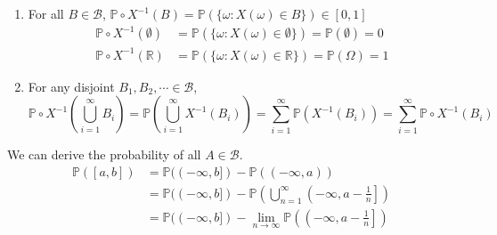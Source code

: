 \documentclass{huhtakm-template-book}
\newcommand{\prob}{\mathbb{P}}
\begin{document}
    \begin{proofing}
        \begin{enumerate}
            \item For all $B\in\mathcal{B}$, $\prob\circ X^{-1}(B)=\prob(\{\omega:X(\omega)\in B\})\in [0,1]$
            \begin{align*}
                \prob\circ X^{-1}(\emptyset)&=\prob(\{\omega:X(\omega)\in\emptyset\})=\prob(\emptyset)=0\\
                \prob\circ X^{-1}(\mathbb{R})&=\prob(\{\omega:X(\omega)\in\mathbb{R}\})=\prob(\Omega)=1
            \end{align*}
            \item For any disjoint $B_{1},B_{2},\cdots\in\mathcal{B}$,
            \begin{equation*}
                \prob\circ X^{-1}\left(\bigcup_{i=1}^{\infty}B_{i}\right)=\prob\left(\bigcup_{i=1}^{\infty}X^{-1}(B_{i})\right)=\sum_{i=1}^{\infty}\prob(X^{-1}(B_{i}))=\sum_{i=1}^{\infty}\prob\circ X^{-1}(B_{i})
            \end{equation*}
        \end{enumerate}
    \end{proofing}
    \begin{rem}
        We can derive the probability of all $A\in\mathcal{B}$.
        \begin{align*}
            \prob([a,b])&=\prob((-\infty,b])-\prob((-\infty,a))\\
            &=\prob((-\infty,b])-\prob\left(\bigcup_{n=1}^{\infty}\left(-\infty,a-\frac{1}{n}\right]\right)\\
            &=\prob((-\infty,b])-\lim_{n\to\infty}\prob\left(\left(-\infty,a-\frac{1}{n}\right]\right)
        \end{align*}
    \end{rem}
    \newpage
\end{document}
